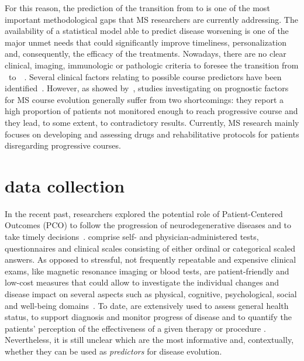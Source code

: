 
For this reason, the prediction of the transition from \RR to \SP is one of the most important methodological gaps that MS researchers are currently addressing.
The availability of a statistical model able to predict disease worsening is one of the major unmet needs that could significantly improve timeliness, personalization and, consequently, the efficacy of the treatments.
Nowadays, there are no clear clinical, imaging, immunologic or pathologic criteria to foresee the transition from \RR~to~\SP~\cite{lublin2014defining}. Several clinical factors relating to possible \SP course predictors have been identified~\cite{bergamaschi2015bremso, dickens2014type}.
However, as showed by~\cite{vukusic2003prognostic}, studies investigating on prognostic factors for MS course evolution generally suffer from two shortcomings: they
report a high proportion of \RR patients not monitored enough to reach progressive course and they lead, to some extent, to contradictory results.
Currently, MS research mainly focuses on developing and assessing drugs and rehabilitative protocols for \RR patients disregarding progressive courses.

\section{\PCOs data collection}\label{sec:proms_data_collection}

In the recent past, researchers explored the potential role of Patient-Centered Outcomes (\ac{PCO}) to follow the progression of neurodegenerative diseases and to take timely decisions~\cite{black2013patient}. %
\PCOs comprise self- and physician-administered tests, questionnaires and clinical scales consisting of either ordinal or categorical scaled answers.
As opposed to stressful, not frequently repeatable and expensive clinical exams, like magnetic resonance imaging or blood tests, \PCOs are patient-friendly and low-cost measures that could allow to investigate the individual changes and disease impact on several aspects such as physical, cognitive, psychological, social and well-being domains~\cite{fiorini2015machine}.
To date, \PCOs are extensively used to assess general health status, to support diagnosis and monitor progress of disease and to quantify the patients' perception of the effectiveness of a given therapy or procedure \cite{nelson2015patient}.
Nevertheless, it is still unclear which are the most informative \PCOs and, contextually, whether they can be used as {\em predictors} for disease evolution.

